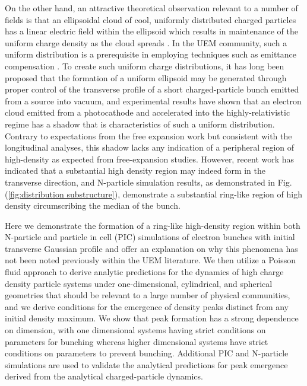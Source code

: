 \documentclass[aps,prl,twocolumn,showpacs,superscriptaddress,groupedaddress]{revtex4-1}  %
\begin{document}
{On the other hand, an 
attractive theoretical observation relevant to a number
of fields is 
that an ellipsoidal cloud of cool, uniformly distributed
charged particles has a linear electric field within the ellipsoid which results in maintenance of the 
uniform charge density as the cloud spreads \cite{Grech:2011_coulomb_explosion}.    
In the UEM community, such a uniform distribution is a prerequisite 
in employing techniques such as emittance compensation \cite{Rosenzweig:2006_emittance_compensation}.
To create such uniform charge distributions, it has long been proposed that the formation of a uniform ellipsoid may be generated through
proper control of the transverse profile 
of a short charged-particle bunch emitted from a source into vacuum\cite{Luiten:2004_uniform_ellipsoidal}, 
and experimental results have shown that  
an electron cloud emitted from a photocathode and accelerated into the highly-relativistic regime has a shadow that is characteristics of 
such a uniform distribution\cite{Musucemi:2008_generate_uniform_ellipsoid}.  Contrary to
expectations from the free expansion work but consistent with the longitudinal analyses, this shadow
lacks any indication of a peripheral region of high-density as expected from free-expansion studies.
However, recent work has indicated that a substantial high density region may indeed form in
the transverse direction\cite{Williams:2017_transverse_emittance}, and N-particle simulation results, as
demonstrated in Fig. (\ref{fig:distribution substructure}), demonstrate a substantial
ring-like region of high density circumscribing the median of the bunch.
  
Here we demonstrate the formation of a ring-like high-density region
within both N-particle and particle in cell (PIC)
simulations of electron bunches with initial transverse Gaussian profile
and offer an explanation on why this phenomena has not been noted previously
within the UEM literature.  
We then utilize a Poisson fluid approach to derive analytic predictions 
for the dynamics of high charge density particle systems under one-dimensional, 
cylindrical, and spherical geometries
that should be relevant to a large number of physical communities, and we derive conditions 
for the emergence of density peaks distinct from any initial density maximum.
We show that peak formation has a strong dependence on 
dimension, with one dimensional systems having strict conditions on parameters for bunching whereas higher
dimensional systems have strict conditions on parameters to prevent bunching.   Additional PIC and
N-particle simulations are 
used to validate the analytical predictions for peak emergence
derived from the analytical charged-particle dynamics.  

}
\end{document}

